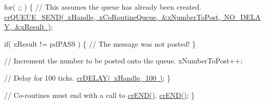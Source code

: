 \begin{DoxyPre}   for( ;; )
   \{
       // This assumes the queue has already been created.
       \mbox{\hyperlink{croutine_8h_a26af3d36f22a04168eebdf5b08465d6e}{crQUEUE\_SEND( xHandle, xCoRoutineQueue, &xNumberToPost, NO\_DELAY, &xResult )}};\end{DoxyPre}



\begin{DoxyPre}       if( xResult != pdPASS )
       \{
           // The message was not posted!
       \}\end{DoxyPre}



\begin{DoxyPre}       // Increment the number to be posted onto the queue.
       xNumberToPost++;\end{DoxyPre}



\begin{DoxyPre}       // Delay for 100 ticks.
       \mbox{\hyperlink{croutine_8h_a05a06feb11028f2d1d440ea335f562ba}{crDELAY( xHandle, 100 )}};
   \}\end{DoxyPre}



\begin{DoxyPre}   // Co-routines must end with a call to \mbox{\hyperlink{croutine_8h_ae6038cc976689b50000475ebfc4e2f23}{crEND()}}.
   \mbox{\hyperlink{croutine_8h_ae6038cc976689b50000475ebfc4e2f23}{crEND()}};
\}\end{DoxyPre}
 